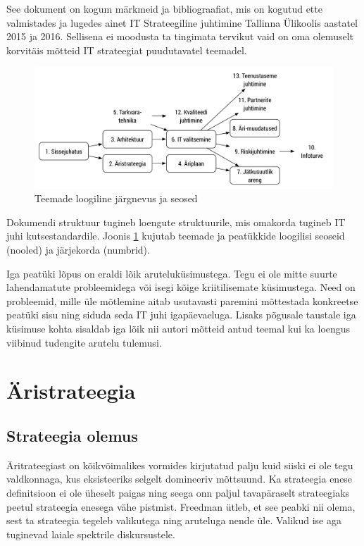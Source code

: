\documentclass{tufte-book}
\begin{document}
See dokument on kogum märkmeid ja bibliograafiat, mis on kogutud ette valmistades ja lugedes ainet IT Strateegiline juhtimine Tallinna Ülikoolis aastatel 2015 ja 2016. Sellisena ei moodusta ta tingimata tervikut vaid on oma olemuselt korvitäis mõtteid IT strateegiat puudutavatel teemadel.


\begin{figure}[h]
	\begin{center}
		\includegraphics[width=\linewidth]{aine_struktuur.pdf}
		\caption{Teemade loogiline järgnevus ja seosed}
		\label{fig:intro:structure}
	\end{center}
\end{figure}

Dokumendi struktuur tugineb loengute struktuurile, mis omakorda tugineb IT juhi kutsestandardile. Joonis \ref{fig:intro:structure} kujutab teemade ja peatükkide loogilisi seoseid (nooled) ja järjekorda (numbrid).

Iga peatüki lõpus on eraldi lõik aruteluküsimustega. Tegu ei ole mitte suurte lahendamatute probleemidega või isegi kõige kriitilisemate küsimustega. Need on probleemid, mille üle mõtlemine aitab usutavasti paremini mõttestada konkreetse peatüki sisu ning siduda seda IT juhi igapäevaeluga. Lisaks põgusale taustale iga küsimuse kohta sisaldab iga lõik nii autori mõtteid antud teemal kui ka loengus viibinud tudengite arutelu tulemusi.

\mainmatter

\chapter{Äristrateegia}
\section{Strateegia olemus}
Äritrateegiast on kõikvõimalikes vormides kirjutatud palju kuid siiski ei ole tegu valdkonnaga, kus eksisteeriks selgelt domineeriv mõttsuund. Ka strateegia enese definitsioon ei ole üheselt paigas ning seega onn paljul tavapäraselt strateegiaks peetul strateegia enesega vähe pistmist\cite{de2006strategy}. Freedman ütleb, et see peabki nii olema, sest ta strateegia tegeleb valikutega ning aruteluga nende üle. Valikud ise aga tuginevad laiale spektrile diskursustele.\cite{freedman2013strategy} 
\end{document}
